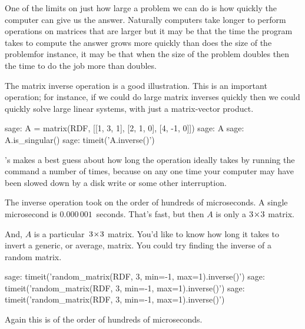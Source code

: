 One of the limits on just how large a problem we can do is how quickly 
the computer can give us the answer.
Naturally computers take longer to perform operations 
on matrices that are larger
but it may be that the time the program takes to compute the answer
grows more quickly than does the size of the problem\Dash for instance, 
it may be that when the size of the problem doubles then the time to 
do the job more than doubles.

The matrix inverse operation is a good illustration.
This is an important operation; for instance, if we could do large matrix 
inverses
quickly then we could quickly solve large linear systems, 
with just a matrix-vector product.
\begin{sagecommandline}
sage: A = matrix(RDF, [[1, 3, 1], [2, 1, 0], [4, -1, 0]])
sage: A
sage: A.is_singular()
sage: timeit('A.inverse()')
\end{sagecommandline}
\noindent
\Sage's  makes a best guess about how long
the operation ideally takes by running the command 
a number of times, because on any one time your
computer may have been slowed down by a 
disk write or some other interruption.

The inverse operation took on the order of hundreds of microseconds.
A single microsecond is 
$0.000\,001$~seconds.
That's fast, but then $A$ is only a $3 \! \times \! 3$ matrix.

And, $A$ is a particular~$3 \! \times \! 3$ matrix. 
You'd like to know
how long it takes to invert a generic, or average, matrix.
You could try finding the inverse of a random matrix.
\begin{sagecommandline}
sage: timeit('random_matrix(RDF, 3, min=-1, max=1).inverse()')
sage: timeit('random_matrix(RDF, 3, min=-1, max=1).inverse()')
sage: timeit('random_matrix(RDF, 3, min=-1, max=1).inverse()')
\end{sagecommandline}
\noindent
Again this is of the order of hundreds of microseconds.

